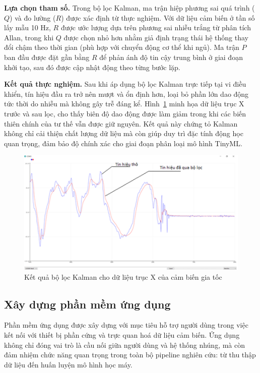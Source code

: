 \textbf{Lựa chọn tham số.} Trong bộ lọc Kalman, ma trận hiệp phương sai quá trình ($Q$) và đo lường ($R$) được xác định từ thực nghiệm. Với dữ liệu cảm biến ở tần số lấy mẫu 10 Hz, $R$ được ước lượng dựa trên phương sai nhiễu trắng từ phân tích Allan, trong khi $Q$ được chọn nhỏ hơn nhằm giả định trạng thái hệ thống thay đổi chậm theo thời gian (phù hợp với chuyển động cơ thể khi ngủ). Ma trận $P$ ban đầu được đặt gần bằng $R$ để phản ánh độ tin cậy trung bình ở giai đoạn khởi tạo, sau đó được cập nhật động theo từng bước lặp.

\textbf{Kết quả thực nghiệm.} Sau khi áp dụng bộ lọc Kalman trực tiếp tại vi điều khiển, tín hiệu đầu ra trở nên mượt và ổn định hơn, loại bỏ phần lớn dao động tức thời do nhiễu mà không gây trễ đáng kể. Hình~\ref{kalman} minh họa dữ liệu trục X trước và sau lọc, cho thấy biên độ dao động được làm giảm trong khi các biến thiên chính của tư thế vẫn được giữ nguyên. Kết quả này chứng tỏ Kalman không chỉ cải thiện chất lượng dữ liệu mà còn giúp duy trì đặc tính động học quan trọng, đảm bảo độ chính xác cho giai đoạn phân loại mô hình TinyML.

\begin{figure}[htbp]
\centering
\includegraphics[width=\textwidth]{images/kalman.png}
\caption{Kết quả bộ lọc Kalman cho dữ liệu trục X của cảm biến gia tốc}
\label{kalman}
\end{figure}


\subsection{Xây dựng phần mềm ứng dụng}

Phần mềm ứng dụng được xây dựng với mục tiêu hỗ trợ người dùng trong việc kết nối với thiết bị phần cứng và trực quan hoá dữ liệu cảm biến. Ứng dụng không chỉ đóng vai trò là cầu nối giữa người dùng và hệ thống nhúng, mà còn đảm nhiệm chức năng quan trọng trong toàn bộ pipeline nghiên cứu: từ thu thập dữ liệu đến huấn luyện mô hình học máy.

